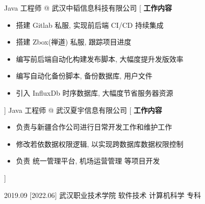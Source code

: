 \documentclass[zh]{resume}
\begin{document}
\begin{experiences}
  {Java 工程师 @ {\color{accentcolor} 武汉中韬信息科技有限公司} }%
	[
    {\textbf{工作内容}}
      \begin{itemize}
        \item 搭建 Gitlab 私服, 实现前后端 CI/CD 持续集成
        \item 搭建 Zbox(禅道) 私服, 跟踪项目进度
        \item 编写前后端自动化构建发布脚本, 大幅度提升发版效率
        \item 编写自动化备份脚本, 备份数据库, 用户文件
        \item 引入 InfluxDb 时序数据库, 大幅度节省服务器资源
      \end{itemize}
  ]
	\separator{0.5ex}
  {Java 工程师 @ {\color{accentcolor} 武汉夏宇信息有限公司} }%
	[
    {\textbf{工作内容}}
      \begin{itemize}
        \item 负责与新疆合作公司进行日常开发工作和维护工作
        \item 修改若依数据权限逻辑, 以实现跨数据库数据权限控制
        \item 负责 统一管理平台, 机场运营管理 等项目开发
      \end{itemize}
  ]

\end{experiences}

\begin{educations}
	\education%
	{2019.09}%
	[2022.06]%
	{武汉职业技术学院}%
	{软件技术}%
	{计算机科学}%
	{专科}
\end{educations}

\newpage
{}
\end{document}
